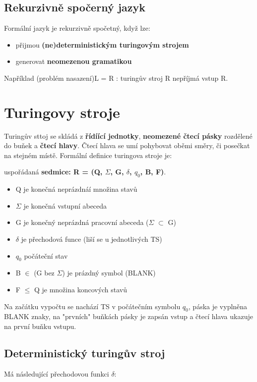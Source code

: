 \documentclass{../../szzclass}
\begin{document}
\subsection{Rekurzivně spočerný jazyk}
Formální jazyk je rekurzivně spočetný, když lze:
\begin{itemize}
	\item přijmou \textbf{(ne)deterministickým turingovým strojem}
	\item generovat \textbf{neomezenou gramatikou}
\end{itemize}
Například (problém nasazení)L = {R : turingův stroj R nepříjmá vstup R}.

\section{Turingovy stroje}
Turingův sttoj se skládá z \textbf{řídíící jednotky}, \textbf{neomezené čtecí pásky} rozdělené do buňek a \textbf{čtecí hlavy}.
Čtecí hlava se umí pohybovat oběmi směry, či posečkat na stejném místě.
\newline
Formální definice turingova stroje je:

uspořádaná \textbf{sedmice: R = (Q, $\Sigma$, G, $\delta$, $q_0$, B, F)}. 
\begin{itemize}
	\item Q je konečná neprázdnáí množina stavů
	\item $\Sigma$ je konečná vstupní abeceda
	\item G je konečný neprázdná pracovní abeceda ($\Sigma$ $\subset$ G)
	\item $\delta$ je přechodová funce (liší se u jednotlivých TS)
	\item $q_0$ počáteční stav
	\item B $\in$ (G bez $\Sigma$) je prázdný symbol (BLANK)
	\item F $\leq$ Q je množina koncových stavů
\end{itemize}
Na začátku vypočtu se nachází TS v počátečním symbolu $q_0$, páska je vyplněna BLANK znaky, na "prvních" buňkách pásky je zapsán vstup a čtecí hlava ukazuje na první buňku vstupu. 

\subsection{Deterministický turingův stroj}
Má následující přechodovou funkci $\delta$:
\end{document}
